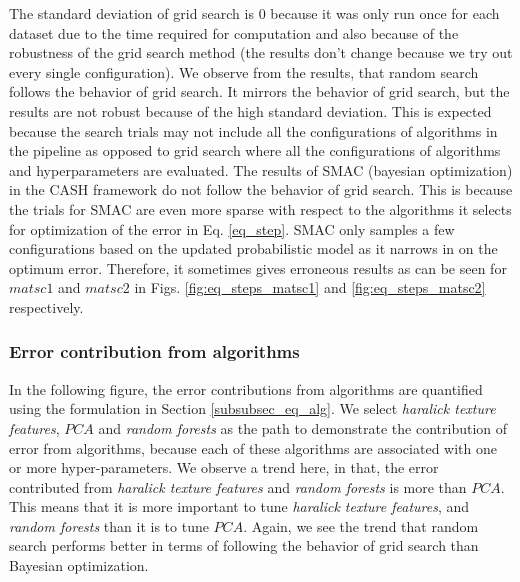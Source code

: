  The standard deviation of grid search is 0 because it was only run once for each dataset due to the time required for computation and also because of the robustness of the grid search method (the results don't change because we try out every single configuration). We observe from the results, that random search follows the behavior of grid search. It mirrors the behavior of grid search, but the results are not robust because of the high standard deviation. This is expected because the search trials may not include all the configurations of algorithms in the pipeline as opposed to grid search where all the configurations of algorithms and hyperparameters are evaluated. The results of SMAC (bayesian optimization) in the CASH framework do not follow the behavior of grid search. This is because the trials for SMAC are even more sparse with respect to the algorithms it selects for optimization of  the error in Eq. \ref{eq_step}. SMAC only samples a few configurations based on the updated probabilistic model as it narrows in on the optimum error. Therefore, it sometimes gives erroneous results as can be seen for $matsc1$ and $matsc2$ in Figs. \ref{fig:eq_steps_matsc1} and \ref{fig:eq_steps_matsc2} respectively.


\subsubsection{Error contribution from algorithms}

In the following figure, the error contributions from algorithms are quantified using the formulation in Section \ref{subsubsec_eq_alg}. We select \textit{haralick texture features}, $PCA$ and \textit{random forests} as the path to demonstrate the contribution of error from algorithms, because each of these algorithms are associated with one or more hyper-parameters. We observe a trend here, in that, the error contributed from \textit{haralick texture features} and \textit{random forests} is more than $PCA$. This means that it is more important to tune \textit{haralick texture features}, and \textit{random forests} than it is to tune  $PCA$. Again, we see the trend that random search performs better in terms of following the behavior of grid search than Bayesian optimization.

